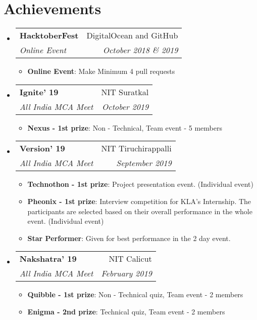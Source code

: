 \documentclass[letterpaper,11pt]{article}
\makeatletter
\newcommand{\resumeItem}[2]{
	\item\small{
    		\textbf{#1}{: #2 \vspace{-2pt}}
  	}
}
\newcommand{\resumeSubheading}[4]{
  	\vspace{-1pt}\item
    	\begin{tabular*}{0.97\textwidth}[t]{l@{\extracolsep{\fill}}r}
      		\textbf{#1} & #2 \\
      		\textit{\small#3} & \textit{\small #4} \\
    	\end{tabular*}\vspace{-5pt}
}
\newcommand{\resumeSubHeadingListStart}{\begin{itemize}[leftmargin=*]}
\newcommand{\resumeSubHeadingListEnd}{\end{itemize}}
\newcommand{\resumeItemListStart}{\begin{itemize}}
\newcommand{\resumeItemListEnd}{\end{itemize}\vspace{-5pt}}
\makeatother
\begin{document}
\section{Achievements}
  	\resumeSubHeadingListStart
		\resumeSubheading
      			{HacktoberFest}{DigitalOcean and GitHub}
      			{Online Event}{October 2018 \& 2019}
			\resumeItemListStart
      				\resumeItem{Online Event}
          				{Make Minimum 4 pull requests}
       			\resumeItemListEnd
		\resumeSubheading
      			{Ignite' 19}{NIT Suratkal}
      			{All India MCA Meet}{October 2019}
			\resumeItemListStart
      				\resumeItem{Nexus - 1st prize}
          				{Non - Technical, Team event - 5 members}
       			\resumeItemListEnd
		\resumeSubheading
      			{Version' 19}{NIT Tiruchirappalli}
      			{All India MCA Meet}{September 2019}
			\resumeItemListStart
      				\resumeItem{Technothon - 1st prize}
          				{Project presentation event. (Individual event)}
				\resumeItem{Pheonix - 1st prize}
          				{Interview competition for KLA's Internship. The participants are selected based on their overall performance in the whole event. (Individual event)}
				\resumeItem{Star Performer}
          				{Given for best performance in the 2 day event.}
       			\resumeItemListEnd
   		\resumeSubheading
      			{Nakshatra' 19}{NIT Calicut}
      			{All India MCA Meet}{February 2019}
			\resumeItemListStart
      				\resumeItem{Quibble - 1st prize}
          				{Non - Technical quiz, Team event - 2 members}
				\resumeItem{Enigma - 2nd prize}
          				{Technical quiz, Team event - 2 members}
       			\resumeItemListEnd
  	\resumeSubHeadingListEnd

\end{document}
